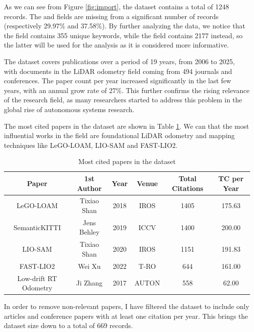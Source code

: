\documentclass{article}
\begin{document}
As we can see from Figure \ref{fig:import}, the dataset contains a total of 1248 records. The  and  fields are missing from a significant number of records (respectively 29.97\% and 37.58\%). By further analyzing the data, we notice that the  field contains 355 unique keywords, while the  field contains 2177 instead, so the latter will be used for the analysis as it is considered more informative.

The dataset covers publications over a period of 19 years, from 2006 to 2025, with documents in the LiDAR odometry field coming from 494 journals and conferences. The paper count per year increased significantly in the last few years, with an annual grow rate of 27\%. This further confirms the rising relevance of the research field, as many researchers started to address this problem in the global rise of autonomous systems research.

The most cited papers in the dataset are shown in Table \ref{table:most_cited}. We can that the most influential works in the field are foundational LiDAR odometry and mapping techniques like LeGO-LOAM\cite{legoloam}, LIO-SAM\cite{liosam} and FAST-LIO2\cite{fastlio}.

\begin{table}[h!]
    \centering
    \begin{tabular}{||c c c c c c||}
        \hline
        \textbf{Paper} & \textbf{1st Author} & \textbf{Year} & \textbf{Venue} &  \textbf{Total Citations} & \textbf{TC per Year} \\ [0.5ex]
        \hline\hline
        LeGO-LOAM & Tixiao Shan & 2018 & IROS & 1405 & 175.63 \\
        \hline
        SemanticKITTI & Jens Behley & 2019 & ICCV & 1400 & 200.00 \\
        \hline
        LIO-SAM & Tixiao Shan & 2020 & IROS & 1151	& 191.83 \\
        \hline
        FAST-LIO2 & Wei Xu & 2022 & T-RO & 644	& 161.00 \\
        \hline
        Low-drift RT Odometry & Ji Zhang & 2017 & AUTON & 558 & 62.00 \\
        \hline
    \end{tabular}
    \caption{Most cited papers in the dataset}
    \label{table:most_cited}
\end{table}

In order to remove non-relevant papers, I have filtered the dataset to include only articles and conference papers with at least one citation per year. This brings the dataset size down to a total of 669 records.
\end{document}
